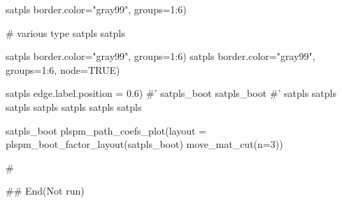 \documentclass[a4paper]{book}
\begin{document}
\begin{Examples}
\begin{ExampleCode}
satpls %
                            border.color="gray99", groups=1:6)


# various type
satpls %
satpls %

satpls %
                                 border.color="gray99", groups=1:6)
satpls %
                                 border.color="gray99", groups=1:6, node=TRUE)

satpls %
                                 edge.label.position = 0.6)
#'
satpls_boot%
satpls_boot%
#'
satpls %
satpls %
satpls %
satpls %
satpls %
satpls %
satpls %

satpls_boot %
plspm_path_coefs_plot(layout =  plspm_boot_factor_layout(satpls_boot)%
 move_mat_cut(n=3))

\#



## End(Not run)
\end{ExampleCode}
\end{Examples}
\end{document}
